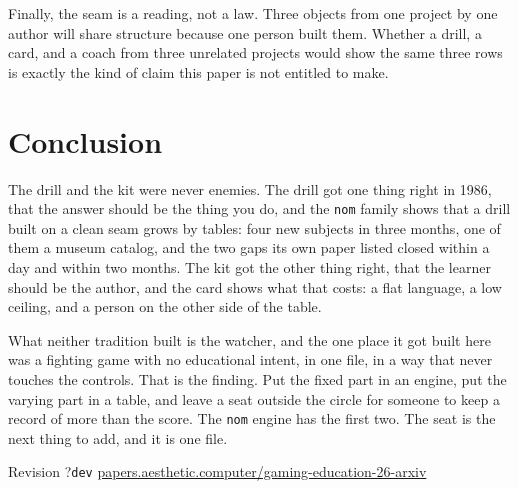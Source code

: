\documentclass[10pt,letterpaper,twocolumn]{article}
\newcommand{\code}[1]{\texttt{#1}}
\providecommand{\paperhash}{dev}\providecommand{\paperrev}{?}}
\begin{document}
Finally, the seam is a reading, not a law. Three objects from one project by one author will share structure because one person built them. Whether a drill, a card, and a coach from three unrelated projects would show the same three rows is exactly the kind of claim this paper is not entitled to make.

\section{Conclusion}
\label{sec:conclusion}

The drill and the kit were never enemies. The drill got one thing right in 1986, that the answer should be the thing you do, and the \code{nom} family shows that a drill built on a clean seam grows by tables: four new subjects in three months, one of them a museum catalog, and the two gaps its own paper listed closed within a day and within two months. The kit got the other thing right, that the learner should be the author, and the card shows what that costs: a flat language, a low ceiling, and a person on the other side of the table.

What neither tradition built is the watcher, and the one place it got built here was a fighting game with no educational intent, in one file, in a way that never touches the controls. That is the finding. Put the fixed part in an engine, put the varying part in a table, and leave a seat outside the circle for someone to keep a record of more than the score. The \code{nom} engine has the first two. The seat is the next thing to add, and it is one file.


\setlength{\bibsep}{0.6pt plus 0.2ex}
{\footnotesize}

\vspace{0.8em}
\begin{center}
\footnotesize\sffamily\color{acgray}
Revision \paperrev\;\textperiodcentered\;\texttt{\paperhash}\;\textperiodcentered\;
\href{https://papers.aesthetic.computer/gaming-education-26-arxiv.pdf}{papers.aesthetic.computer/gaming-education-26-arxiv}
\end{center}
\end{document}
